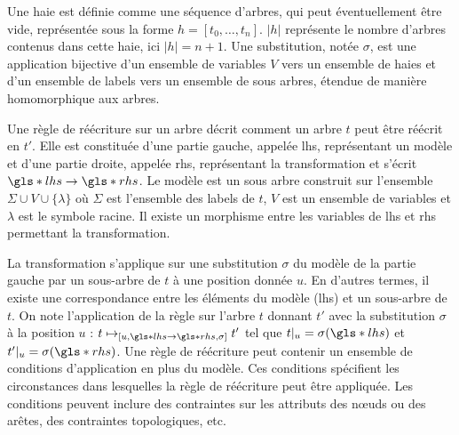 \begin{definition}[Haie]
    Une haie est définie comme une séquence d'arbres, qui peut éventuellement être vide, représentée sous la forme $h = [t_0, \dots , t_n]$.
    $|h|$ représente le nombre d'arbres contenus dans cette haie, ici $|h| = n + 1$.
    Une substitution, notée $\sigma$, est une application bijective d'un ensemble de variables $V$ vers un ensemble de haies et d'un ensemble de labels vers un ensemble de sous arbres, étendue de manière homomorphique aux arbres.
\end{definition}

\begin{definition}
    Une règle de réécriture sur un arbre décrit comment un arbre $t$ peut être réécrit en $t'$.
    Elle est constituée d'une partie gauche, appelée \gls{lhs}, représentant un modèle et d'une partie droite, appelée \gls{rhs}, représentant la transformation et s'écrit $\gls*{lhs} \to \gls*{rhs}$.
    Le modèle est un sous arbre construit sur l'ensemble $\Sigma \cup V \cup \{\lambda\}$ où $\Sigma$ est l'ensemble des labels de $t$, $V$ est un ensemble de variables et $\lambda$ est le symbole racine.
    Il existe un morphisme entre les variables de \gls{lhs} et \gls{rhs} permettant la transformation.

    La transformation s'applique sur une substitution $\sigma$ du modèle de la partie gauche par un sous-arbre de $t$ à une position donnée $u$.
    En d'autres termes, il existe une correspondance entre les éléments du modèle (\gls{lhs}) et un sous-arbre de $t$.
    On note l'application de la règle sur l'arbre $t$ donnant $t'$ avec la substitution $\sigma$ à la position $u$ : $t \mapsto_{[u, \gls*{lhs} \to \gls*{rhs}, \sigma]} t'$ tel que $t|_u = \sigma(\gls*{lhs})$ et $t'|_u = \sigma(\gls*{rhs})$.
    Une règle de réécriture peut contenir un ensemble de conditions d'application en plus du modèle.
    Ces conditions spécifient les circonstances dans lesquelles la règle de réécriture peut être appliquée.
    Les conditions peuvent inclure des contraintes sur les attributs des nœuds ou des arêtes, des contraintes topologiques, etc.
\end{definition}


